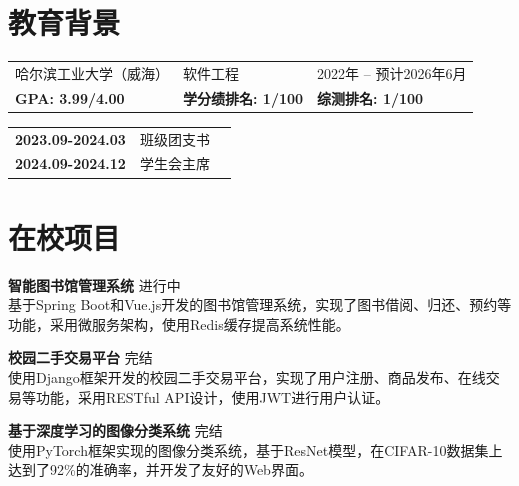 \section{\makebox[\widthof{\faGraduationCap}][c]{\color{HIT_Blue}{\faGraduationCap}}\quad 教育背景}
\vspace{-0.5em}
\begin{table}[h!]
    \begin{tabularx}{\textwidth}{XXp{}}
        哈尔滨工业大学（威海） & 软件工程 & 2022年 -- 预计2026年6月\\
        \textbf{GPA: 3.99/4.00} & \textbf{学分绩排名: 1/100} & \textbf{综测排名: 1/100} \\
    \end{tabularx}
\end{table}
\begin{tabularx}{\textwidth}{@{}XlX@{}}
    \textbf{2023.09-2024.03} & 班级团支书 & \\
    \textbf{2024.09-2024.12} & 学生会主席 & \\
\end{tabularx}

\section{\makebox[\widthof{\faChalkboardTeacher}][c]{\color{HIT_Blue}{\faChalkboardTeacher}}\quad 在校项目}
\vspace{0.5em}
{\large{\textbf{智能图书馆管理系统}}} \hfill {进行中}\\
基于Spring Boot和Vue.js开发的图书馆管理系统，实现了图书借阅、归还、预约等功能，采用微服务架构，使用Redis缓存提高系统性能。

\vspace{1em}
{\large{\textbf{校园二手交易平台}}} \hfill {完结}\\
使用Django框架开发的校园二手交易平台，实现了用户注册、商品发布、在线交易等功能，采用RESTful API设计，使用JWT进行用户认证。

\vspace{1em}
{\large{\textbf{基于深度学习的图像分类系统}}} \hfill {完结}\\
使用PyTorch框架实现的图像分类系统，基于ResNet模型，在CIFAR-10数据集上达到了92\%的准确率，并开发了友好的Web界面。

